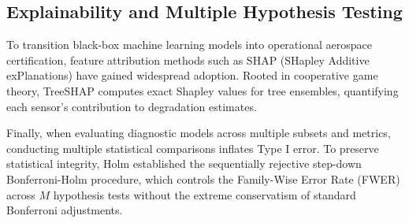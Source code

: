 \subsection{Explainability and Multiple Hypothesis Testing}
To transition black-box machine learning models into operational aerospace certification, feature attribution methods such as SHAP (SHapley Additive exPlanations) \cite{lundberg2017unified} have gained widespread adoption. Rooted in cooperative game theory, TreeSHAP computes exact Shapley values for tree ensembles, quantifying each sensor's contribution to degradation estimates.

Finally, when evaluating diagnostic models across multiple subsets and metrics, conducting multiple statistical comparisons inflates Type I error. To preserve statistical integrity, Holm \cite{holm1979simple} established the sequentially rejective step-down Bonferroni-Holm procedure, which controls the Family-Wise Error Rate (FWER) across $M$ hypothesis tests without the extreme conservatism of standard Bonferroni adjustments.
